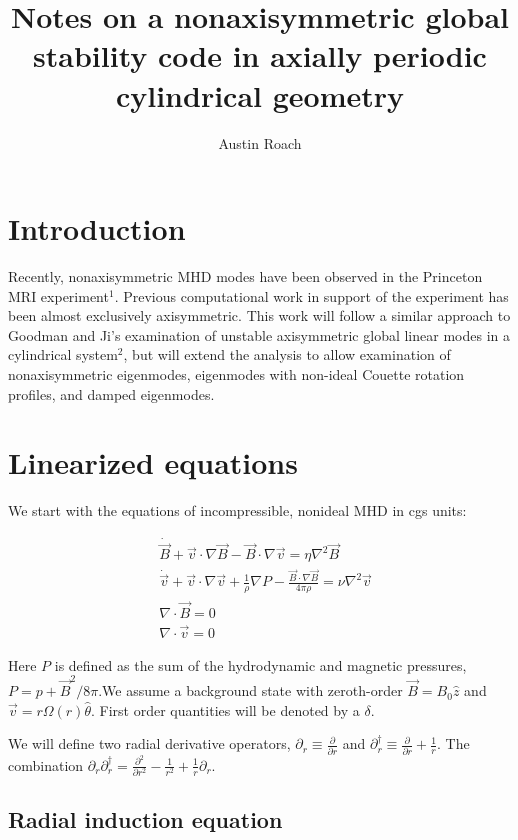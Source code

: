 \documentclass[letterpaper]{article}
\title{Notes on a nonaxisymmetric global stability code in axially periodic
cylindrical geometry}
\author{Austin Roach}
\begin{document}
\maketitle{}

\section{Introduction}

Recently, nonaxisymmetric MHD modes have been observed in the
Princeton MRI experiment$^1$.  Previous computational work in support
of the experiment has been almost exclusively axisymmetric.  This work
will follow a similar approach to Goodman and Ji's examination of
unstable axisymmetric global linear modes in a cylindrical system$^2$,
but will extend the analysis to allow examination of nonaxisymmetric
eigenmodes, eigenmodes with non-ideal Couette rotation profiles, and
damped eigenmodes.

\section{Linearized equations}

We start with the equations of incompressible, nonideal MHD in cgs units:

\begin{align}
&\dot{\vec{B}} + \vec{v}\cdot\nabla\vec{B} - \vec{B}\cdot\nabla\vec{v}
 = \eta\nabla^2 \vec{B}
\\
&\dot{\vec{v}}+\vec{v}\cdot\nabla\vec{v}+\frac{1}{\rho}\nabla{P}
 - \frac{\vec{B}\cdot\nabla\vec{B}}{4\pi\rho}=\nu\nabla^2\vec{v}
\\
&\nabla\cdot\vec{B}=0
\\
&\nabla\cdot\vec{v}=0
\end{align}

Here $P$ is defined as the sum of the hydrodynamic and magnetic
pressures, $P=p+\vec{B}^2/8\pi$.We assume a background state with
zeroth-order $\vec{B}=B_0 \hat{z}$ and $\vec{
  v}=r\Omega(r)\hat{\theta}$.  First order quantities will be denoted
by a $\delta$.

We will define two radial derivative operators, $\partial_r \equiv
\frac{\partial}{\partial r}$ and $\partial_{r}^\dagger \equiv
\frac{\partial}{\partial r}+\frac{1}{r}$.  The combination
$\partial_r \partial_r^\dagger = \frac{\partial^2}{\partial
  r^2}-\frac{1}{r^2}+\frac{1}{r}\partial_r$.

\subsection{Radial induction equation}
\end{document}
